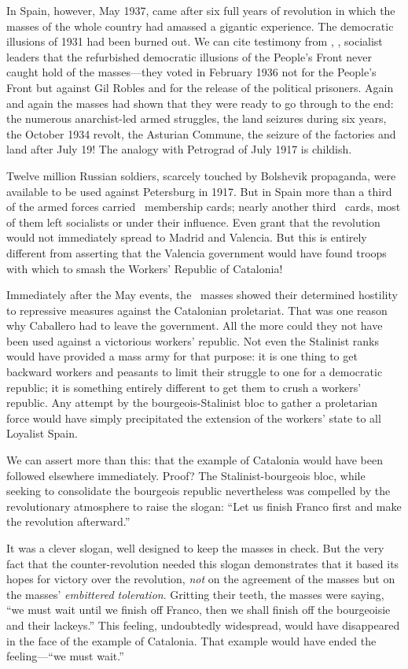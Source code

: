 In Spain, however, May 1937, came after six full years of revolution in which the masses of the whole country had amassed a gigantic experience. The democratic illusions of 1931 had been burned out. We can cite testimony from \CNT, \POUM, socialist leaders that the refurbished democratic illusions of the People’s Front never caught hold of the masses---they voted in February 1936 not for the People’s Front but against Gil Robles and for the release of the political prisoners. Again and again the masses had shown that they were ready to go through to the end: the numerous anarchist-led armed struggles, the land seizures during six years, the October 1934 revolt, the Asturian Commune, the seizure of the factories and land after July 19! The analogy with Petrograd of July 1917 is childish.

Twelve million Russian soldiers, scarcely touched by Bolshevik propaganda, were available to be used against Petersburg in 1917. But in Spain more than a third of the armed forces carried \CNT\ membership cards; nearly another third \UGT\ cards, most of them left socialists or under their influence. Even grant that the revolution would not immediately spread to Madrid and Valencia. But this is entirely different from asserting that the Valencia government would have found troops with which to smash the Workers’ Republic of Catalonia!

Immediately after the May events, the \UGT\ masses showed their determined hostility to repressive measures against the Catalonian proletariat. That was one reason why Caballero had to leave the government. All the more could they not have been used against a victorious workers’ republic. Not even the Stalinist ranks would have provided a mass army for that purpose: it is one thing to get backward workers and peasants to limit their struggle to one for a democratic republic; it is something entirely different to get them to crush a workers’ republic. Any attempt by the bourgeois-Stalinist bloc to gather a proletarian force would have simply precipitated the extension of the workers’ state to all Loyalist Spain.

We can assert more than this: that the example of Catalonia would have been followed elsewhere immediately. Proof? The Stalinist-bourgeois bloc, while seeking to consolidate the bourgeois republic nevertheless was compelled by the revolutionary atmosphere to raise the slogan: ``Let us finish Franco first and make the revolution afterward.''

It was a clever slogan, well designed to keep the masses in check. But the very fact that the counter-revolution needed this slogan demonstrates that it based its hopes for victory over the revolution, \emph{not} on the agreement of the masses but on the masses’ \emph{embittered toleration}. Gritting their teeth, the masses were saying, ``we must wait until we finish off Franco, then we shall finish off the bourgeoisie and their lackeys.'' This feeling, undoubtedly widespread, would have disappeared in the face of the example of Catalonia. That example would have ended the feeling---``we must wait.''

